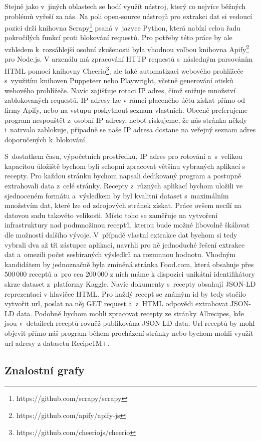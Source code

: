Stejně jako v~jiných oblastech se hodí využít nástroj, který co nejvíce běžných problémů vyřeší za nás. Na poli open-source nástrojů pro extrakci dat si vedoucí pozici drží knihovna Scrapy\footnote{https://github.com/scrapy/scrapy} psaná v~jazyce Python, která nabízí celou řadu pokročilých funkcí proti blokování requestů. Pro potřeby této práce by ale vzhledem k~rozsáhlejší osobní zkušenosti byla vhodnou volbou knihovna Apify\footnote{https://github.com/apify/apify-js} pro Node.js. V arzenálu má zpracování HTTP requestů s~následným parsováním HTML pomocí knihovny Cheerio\footnote{https://github.com/cheeriojs/cheerio}, ale také automatizaci webového prohlížeče s~využitím knihoven Puppeteer nebo Playwright, včetně generování otisků webového prohlížeče. Navíc zajišťuje rotaci IP adres, čímž snižuje množství zablokovaných requestů. IP adresy lze v rámci placeného účtu získat přímo od firmy Apify, nebo na vstupu poskytnout seznam vlastních. Obecně preferujeme program nespouštět z~osobní IP adresy, neboť riskujeme, že nás stránka někdy i~natrvalo zablokuje, případně se naše IP adresa dostane na veřejný seznam adres doporučených k~blokování.

S~dostatkem času, výpočetních prostředků, IP adres pro rotování a~s~velikou kapacitou úložiště bychom byli schopni zpracovat většinu vybraných aplikací s recepty. Pro každou stránku bychom napsali dedikovaný program a postupně extrahovali data z~celé stránky. Recepty z~různých aplikací bychom uložili ve sjednoceném formátu a~výsledkem by byl kvalitní dataset s~maximálním množstvím dat, které lze od zdrojových stránek získat. Práce ovšem necílí na datovou sadu takovéto velikosti. Místo toho se zaměřuje na vytvoření infrastruktury nad podmnožinou receptů, kterou bude možné libovolně škálovat dle možností dalšího vývoje. V~případě vlastní extrakce dat bychom si tedy vybrali dva až tři zástupce aplikací, navrhli pro ně jednoduché řešení extrakce dat a~omezili počet sesbíraných výsledků na rozumnou hodnotu. Vhodným kandidátem by jednoznačně byla zmíněná stránka Food.com, která obsahuje přes $500\,000$ receptů a~pro cca $200\,000$ z nich máme k dispozici unikátní identifikátory skrze dataset z~platformy Kaggle. Navíc dokumenty s~recepty obsahují JSON-LD reprezentaci v hlavičce HTML. Pro každý recept se známým id by tedy stačilo vytvořit url, poslat na něj GET request a~z~HTML odpovědi extrahovat JSON-LD data. Podobně bychom mohli zpracovat recepty ze stránky Allrecipes, kde jsou v~detailech receptů rovněž publikována JSON-LD data. Url receptů by mohl objevit přímo náš program během procházení stránky nebo bychom mohli využít url adresy z datasetu Recipe1M+.

\subsection{Znalostní grafy}

